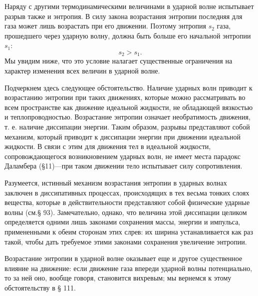 Наряду с другими термодинамическими величинами в ударной волне испытывает разрыв
также и энтропия. В силу закона возрастания энтропии последняя для газа может
лишь возрастать при его движении. Поэтому энтропия $s_2$ газа, прошедшего через
ударную волну, должна быть больше его начальной энтропии $s_1$:
\begin{equation}
	\label{eq:85.11}
	s_2 > s_1.
\end{equation}
Мы увидим ниже, что это условие налагает существенные ограничения на характер
изменения всех величин в ударной волне.

Подчеркнем здесь следующее обстоятельство. Наличие ударных волн приводит к
возрастанию энтропии при таких движениях, которые можно рассматривать во всем
пространстве как движение идеальной жидкости, не обладающей вязкостью и
теплопроводностью. Возрастание энтропии означает необратимость движения, т. е.
наличие диссипации энергии. Таким образом, разрывы представляют собой механизм,
который приводит к диссипации энергии при движении идеальной жидкости. В связи с
этим для движения тел в идеальной жидкости, сопровождающегося возникновением
ударных волн, не имеет места парадокс Даламбера (\S 11)---при таком движении тело
испытывает силу сопротивления.

Разумеется, истинный механизм возрастания энтропии в ударных волнах заключен в
диссипативных процессах, происходящих в тех весьма тонких слоях вещества,
которые в действительности представляют собой физические ударные волны (см.\S
93). Замечательно, однако, что величина этой диссипации целиком определяется
одними лишь законами сохранения массы, энергии и импульса, примененными к обеим
сторонам этих слрев: их ширина устанавливается как раз такой, чтобы дать
требуемое этими законами сохранения увеличение энтропии.

Возрастание энтропии в ударной волне оказывает еще и другое существенное влияние
на движение: если движение газа впереди ударной волны потенциально, то за ней
оно, вообще говоря, становится вихревым; мы вернемся к этому обстоятельству в \S
111.

